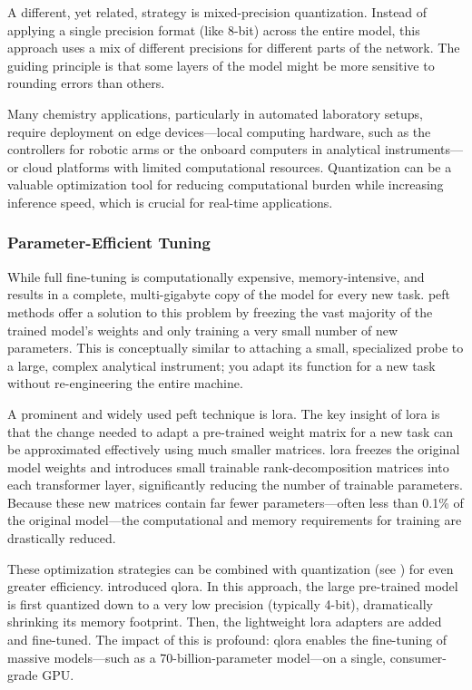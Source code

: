 A different, yet related, strategy is mixed-precision quantization.\autocite{micikevicius2017mixed} Instead of applying a single precision format (like 8-bit) across the entire model, this approach uses a mix of different precisions for different parts of the network. The guiding principle is that some layers of the model might be more sensitive to rounding errors than others.


Many chemistry applications, particularly in automated laboratory setups, require deployment on edge devices---local computing hardware, such as the controllers for robotic arms or the onboard computers in analytical instruments---or cloud platforms with limited computational resources. Quantization can be a valuable optimization tool for reducing computational burden while increasing inference speed, which is crucial for real-time applications.


\subsubsection{Parameter-Efficient Tuning}
\label{sec:peft}

While full fine-tuning is computationally expensive, memory-intensive, and results in a complete, multi-gigabyte copy of the model for every new task. 
\gls{peft} methods offer a solution to this problem by freezing the vast majority of the trained model's weights and only training a very small number of new parameters. This is conceptually similar to attaching a small, specialized probe to a large, complex analytical instrument; you adapt its function for a new task without re-engineering the entire machine.

A prominent and widely used \gls{peft} technique is \gls{lora}.\autocite{hu2022lora}  
The key insight of \gls{lora} is that the change needed to adapt a pre-trained weight matrix for a new task can be approximated effectively using much smaller matrices. \gls{lora} freezes the original model weights and introduces small trainable rank-decomposition matrices into each transformer layer, significantly reducing the number of trainable parameters. 
Because these new matrices contain far fewer parameters—often less than 0.1\% of the original model—the computational and memory requirements for training are drastically reduced.
 
These optimization strategies can be combined with quantization (see ) for even greater efficiency. \textcite{dettmers2023qlora} introduced \gls{qlora}. In this approach, the large pre-trained model is first quantized down to a very low precision (typically 4-bit), dramatically shrinking its memory footprint. 
Then, the lightweight \gls{lora} adapters are added and fine-tuned. The impact of this is profound: \gls{qlora} enables the fine-tuning of massive models---such as a 70-billion-parameter model---on a single, consumer-grade GPU.



